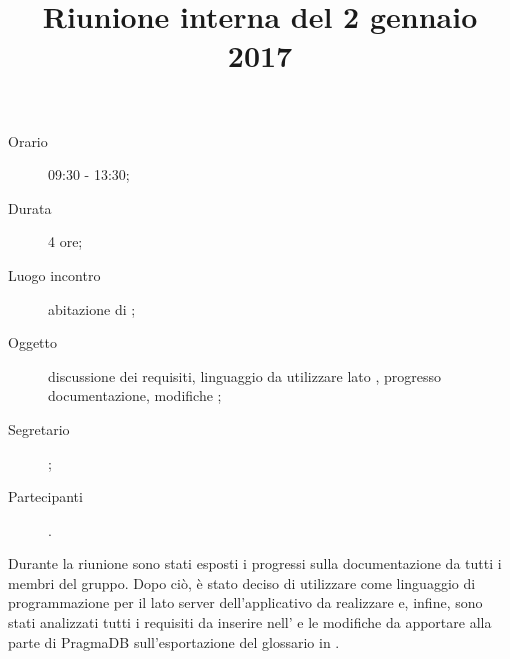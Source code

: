 


\author{\PB}
\supervisor{\MM}
\title{Riunione interna del 2 gennaio 2017}



\maketitle

\begin{description}
	\item[Orario] 09:30 - 13:30;
	\item[Durata] 4 ore;
	\item[Luogo incontro] abitazione di \PB;
	\item[Oggetto] discussione dei requisiti, linguaggio da utilizzare lato , progresso documentazione, modifiche ;
	\item[Segretario] \PB; 
	\item[Partecipanti] \ALL.
\end{description}

Durante la riunione sono stati esposti i progressi sulla documentazione da tutti i membri del gruppo. Dopo ciò, è stato deciso di utilizzare  come linguaggio di programmazione per il lato server dell'applicativo da realizzare e, infine, sono stati analizzati tutti i requisiti da inserire nell'\AdR{} e le modifiche da apportare alla parte  di PragmaDB sull'esportazione del glossario in .


